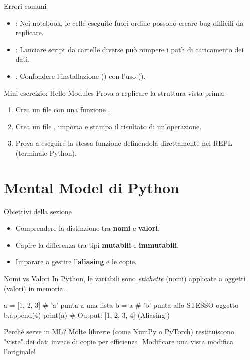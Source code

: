 \documentclass[12pt,aspectratio=169,notheorems]{beamer}
\begin{document}
\begin{frame}{Errori comuni}
    \begin{itemize}
        \item {}: Nei notebook, le celle eseguite fuori ordine possono creare bug difficili da replicare.
        \item {}: Lanciare script da cartelle diverse può rompere i path di caricamento dei dati.
        \item {}: Confondere l'installazione () con l'uso ().
    \end{itemize}
\end{frame}

\begin{frame}{Mini-esercizio: Hello Modules}
    Prova a replicare la struttura vista prima:
    \begin{enumerate}
        \item Crea un file  con una funzione .
        \item Crea un file , importa  e stampa il risultato di un'operazione.
        \item Prova a eseguire la stessa funzione definendola direttamente nel REPL (terminale Python).
    \end{enumerate}
\end{frame}

\section{Mental Model di Python}

\begin{frame}{Obiettivi della sezione}
    \begin{itemize}
        \item Comprendere la distinzione tra \textbf{nomi} e \textbf{valori}.
        \item Capire la differenza tra tipi \textbf{mutabili} e \textbf{immutabili}.
        \item Imparare a gestire l'\textbf{aliasing} e le copie.
    \end{itemize}
\end{frame}

\begin{frame}[fragile]{Nomi vs Valori}
    In Python, le variabili sono \textit{etichette} (nomi) applicate a oggetti (valori) in memoria.
    \begin{python}
        a = [1, 2, 3] # 'a' punta a una lista
        b = a          # 'b' punta allo STESSO oggetto
        b.append(4)
        print(a)       # Output: [1, 2, 3, 4] (Aliasing!)
    \end{python}
    \begin{mlblock}{Perché serve in ML?}
        Molte librerie (come NumPy o PyTorch) restituiscono "viste" dei dati invece di copie per efficienza. Modificare una vista modifica l'originale!
    \end{mlblock}
\end{frame}
\end{document}
